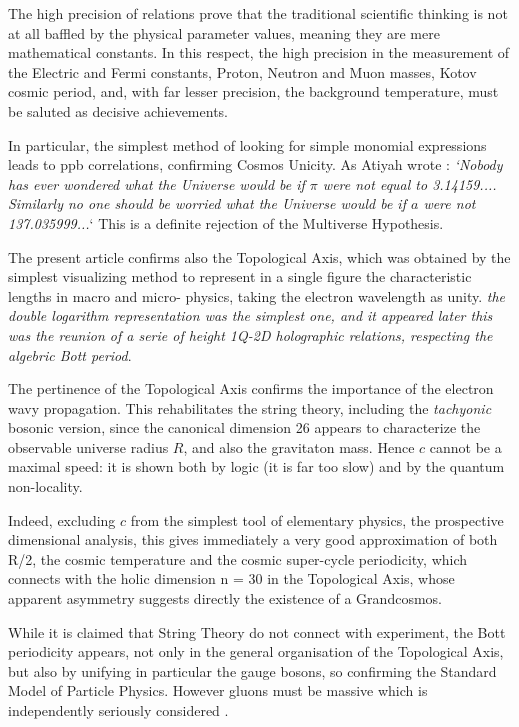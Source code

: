 \documentclass[twoside,draft]{article}
\begin{document}
\begin{sloppypar}
The high precision of relations prove that the traditional scientific thinking is not at all baffled by
the physical parameter values, meaning they are mere mathematical constants. In this respect, the
high precision in the measurement of the Electric and Fermi constants, Proton, Neutron and Muon masses, Kotov cosmic period, and, with far lesser precision, the background temperature, must be saluted as decisive achievements.

In particular, the simplest method of looking for simple monomial expressions leads to ppb correlations, confirming Cosmos Unicity. As Atiyah wrote \cite{Atiyah1}: \textit{`Nobody has
ever wondered what the Universe would be if $\pi$ were not equal to 3.14159.... Similarly no one
should be worried what the Universe would be if $a$ were not 137.035999...}` This is a definite
rejection of the Multiverse Hypothesis.

The present article confirms also the Topological Axis, which was obtained by the simplest visualizing method to represent in a single figure the characteristic lengths in macro and micro-
physics, taking the electron wavelength as unity. \textit {the double logarithm representation was the simplest one, and it appeared later this was the reunion of a serie of height 1Q-2D holographic relations, respecting the algebric Bott period}.

The pertinence of the Topological Axis confirms
the importance of the electron wavy propagation. This rehabilitates the string theory, including the
\textit{tachyonic} bosonic version, since the canonical dimension 26 appears to characterize the observable
universe radius $R$, and also the gravitaton mass. Hence $c$ cannot be a maximal speed: it is shown both by
logic (it is far too slow) and by the quantum non-locality.

Indeed, excluding $c$ from the simplest tool of elementary physics, the prospective dimensional
analysis, this gives immediately a very good approximation of both R/2, the cosmic temperature and the cosmic super-cycle periodicity, which connects with the holic dimension n = 30 in the
Topological Axis, whose apparent asymmetry suggests directly the existence of a Grandcosmos.

While it is claimed that String Theory do not connect with experiment, the Bott periodicity
appears, not only in the general organisation of the Topological Axis, but also by unifying in particular the gauge bosons, so confirming the Standard Model of Particle Physics. However gluons must be massive which is independently seriously considered \cite{Larin}.


\end{sloppypar}
\end{document}
